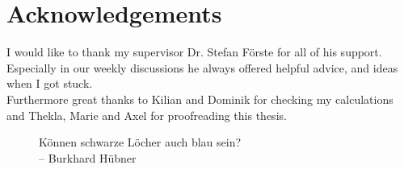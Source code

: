 \chapter*{Acknowledgements}
\label{sec:ack}
I would like to thank my supervisor Dr. Stefan Förste for all of his support. Especially in our weekly discussions he always offered helpful advice, and ideas when I got stuck.\\

Furthermore great thanks to Kilian and Dominik for checking my calculations and Thekla, Marie and Axel for proofreading this thesis. 
\newpage
\begin{figure}
\centering
\huge{Können schwarze Löcher auch blau sein?}\\
\hspace{7cm} \large{-- Burkhard Hübner}
\end{figure}
